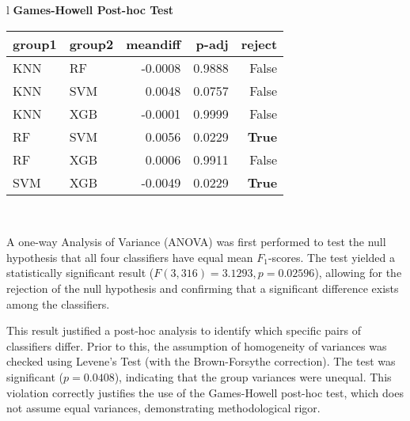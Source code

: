 \begin{table}[tb]
\begin{tabular}{l}
        \toprule
        \textbf{Games-Howell Post-hoc Test}                                                                                \\
        \begin{tabular}{l l r r r}
            \toprule
            \textbf{group1} & \textbf{group2} & \textbf{meandiff} & \textbf{p-adj} & \textbf{reject} \\
            \midrule
            KNN             & RF              & -0.0008           & 0.9888         & False           \\
            KNN             & SVM             & 0.0048            & 0.0757         & False           \\
            KNN             & XGB             & -0.0001           & 0.9999         & False           \\
            RF              & SVM             & 0.0056            & 0.0229         & \textbf{True}   \\
            RF              & XGB             & 0.0006            & 0.9911         & False           \\
            SVM             & XGB             & -0.0049           & 0.0229         & \textbf{True}   \\
        \end{tabular}\\
        \bottomrule
    \end{tabular}
\end{table}
A one-way Analysis of Variance (ANOVA) was first performed to test the null hypothesis that all four classifiers have equal mean \(F_1\)-scores. The test yielded a statistically significant result (\(F(3,316)=3.1293,p=0.02596\)), allowing for the rejection of the null hypothesis and confirming that a significant difference exists among the classifiers.  

This result justified a post-hoc analysis to identify which specific pairs of classifiers differ. Prior to this, the assumption of homogeneity of variances was checked using Levene's Test (with the Brown-Forsythe correction). The test was significant (\(p=0.0408\)), indicating that the group variances were unequal. This violation correctly justifies the use of the Games-Howell post-hoc test, which does not assume equal variances, demonstrating methodological rigor.  

